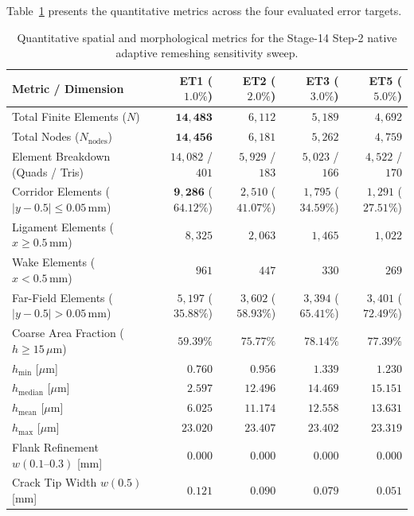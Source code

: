 Table~\ref{tab:step2_error_target_sensitivity_thesis} presents the quantitative metrics across the four evaluated error targets.

\begin{table}[htbp]
\centering
\small
\caption{Quantitative spatial and morphological metrics for the Stage-14 Step-2 native adaptive remeshing sensitivity sweep.}
\label{tab:step2_error_target_sensitivity_thesis}
\begin{tabular}{lrrrr}
\toprule
\textbf{Metric / Dimension} & \textbf{ET1 ($1.0\%$)} & \textbf{ET2 ($2.0\%$)} & \textbf{ET3 ($3.0\%$)} & \textbf{ET5 ($5.0\%$)} \\
\midrule
Total Finite Elements ($N$) & $\mathbf{14{,}483}$ & $6{,}112$ & $5{,}189$ & $4{,}692$ \\
Total Nodes ($N_{\mathrm{nodes}}$) & $\mathbf{14{,}456}$ & $6{,}181$ & $5{,}262$ & $4{,}759$ \\
Element Breakdown (Quads / Tris) & $14{,}082$ / $401$ & $5{,}929$ / $183$ & $5{,}023$ / $166$ & $4{,}522$ / $170$ \\
Corridor Elements ($|y-0.5| \le 0.05\,\mathrm{mm}$) & $\mathbf{9{,}286}$ ($\mathbf{64.12\%}$) & $2{,}510$ ($41.07\%$) & $1{,}795$ ($34.59\%$) & $1{,}291$ ($27.51\%$) \\
Ligament Elements ($x \ge 0.5\,\mathrm{mm}$) & $8{,}325$ & $2{,}063$ & $1{,}465$ & $1{,}022$ \\
Wake Elements ($x < 0.5\,\mathrm{mm}$) & $961$ & $447$ & $330$ & $269$ \\
Far-Field Elements ($|y-0.5| > 0.05\,\mathrm{mm}$) & $5{,}197$ ($35.88\%$) & $3{,}602$ ($58.93\%$) & $3{,}394$ ($65.41\%$) & $3{,}401$ ($72.49\%$) \\
Coarse Area Fraction ($h \ge 15\,\mu\mathrm{m}$) & $59.39\%$ & $75.77\%$ & $78.14\%$ & $77.39\%$ \\
$h_{\min}$ [$\mu\mathrm{m}$] & $0.760$ & $0.956$ & $1.339$ & $1.230$ \\
$h_{\mathrm{median}}$ [$\mu\mathrm{m}$] & $2.597$ & $12.496$ & $14.469$ & $15.151$ \\
$h_{\mathrm{mean}}$ [$\mu\mathrm{m}$] & $6.025$ & $11.174$ & $12.558$ & $13.631$ \\
$h_{\max}$ [$\mu\mathrm{m}$] & $23.020$ & $23.407$ & $23.402$ & $23.319$ \\
Flank Refinement $w(0.1\text{--}0.3)$ [mm] & $\mathbf{0.000}$ & $\mathbf{0.000}$ & $\mathbf{0.000}$ & $\mathbf{0.000}$ \\
Crack Tip Width $w(0.5)$ [mm] & $0.121$ & $0.090$ & $0.079$ & $0.051$ \\

\end{tabular}
\end{table}
